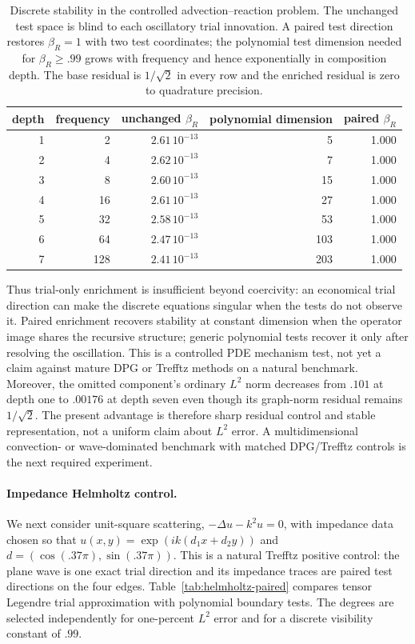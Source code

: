 \documentclass[11pt]{article}
\numberwithin{algorithm}{section}
\theoremstyle{definition}\newtheorem{definition}[theorem]{Definition}
\theoremstyle{remark}\newtheorem{remark}[theorem]{Remark}
\begin{document}
\begin{table}[t]
\centering
\caption{Discrete stability in the controlled advection--reaction problem. The
unchanged test space is blind to each oscillatory trial innovation. A paired
test direction restores $\beta_R=1$ with two test coordinates; the polynomial
test dimension needed for $\beta_R\geq .99$ grows with frequency and hence
exponentially in composition depth. The base residual is $1/\sqrt2$ in every
row and the enriched residual is zero to quadrature precision.}
\begin{tabular}{rrrrr}
\toprule
depth & frequency & unchanged $\beta_R$ & polynomial dimension & paired $\beta_R$\\
\midrule
1 & 2   & $2.61\,10^{-13}$ & 5   & 1.000\\
2 & 4   & $2.62\,10^{-13}$ & 7   & 1.000\\
3 & 8   & $2.60\,10^{-13}$ & 15  & 1.000\\
4 & 16  & $2.61\,10^{-13}$ & 27  & 1.000\\
5 & 32  & $2.58\,10^{-13}$ & 53  & 1.000\\
6 & 64  & $2.47\,10^{-13}$ & 103 & 1.000\\
7 & 128 & $2.41\,10^{-13}$ & 203 & 1.000\\
\bottomrule
\end{tabular}
\label{tab:paired-infsup-pilot}
\end{table}

Thus trial-only enrichment is insufficient beyond coercivity: an economical
trial direction can make the discrete equations singular when the tests do
not observe it. Paired enrichment recovers stability at constant dimension
when the operator image shares the recursive structure; generic polynomial
tests recover it only after resolving the oscillation. This is a controlled
PDE mechanism test, not yet a claim against mature DPG or Trefftz methods on a
natural benchmark. Moreover, the omitted component's ordinary $L^2$ norm
decreases from $.101$ at depth one to $.00176$ at depth seven even though its
graph-norm residual remains $1/\sqrt2$. The present advantage is therefore
sharp residual control and stable representation, not a uniform claim about
$L^2$ error. A multidimensional convection- or wave-dominated benchmark with
matched DPG/Trefftz controls is the next required experiment.

\paragraph{Impedance Helmholtz control.}
We next consider unit-square scattering,
$-\Delta u-k^2u=0$, with impedance data chosen so that
$u(x,y)=\exp(ik(d_1x+d_2y))$ and
$d=(\cos(.37\pi),\sin(.37\pi))$. This is a natural Trefftz positive control:
the plane wave is one exact trial direction and its impedance traces are
paired test directions on the four edges. Table~\ref{tab:helmholtz-paired}
compares tensor Legendre trial approximation with polynomial boundary tests.
The degrees are selected independently for one-percent $L^2$ error and for a
discrete visibility constant of $.99$.
\end{document}
